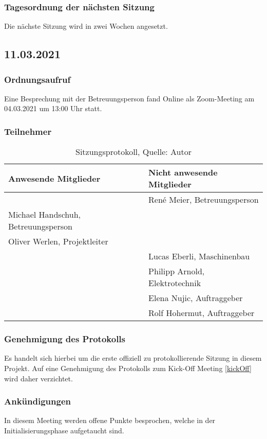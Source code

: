 \subsubsection{Tagesordnung der nächsten Sitzung}
Die nächste Sitzung wird in zwei Wochen angesetzt. 
\newpage
\subsection{11.03.2021}\label{Betreuermeeting1}
\subsubsection{Ordnungsaufruf}
Eine Besprechung mit der Betreuungsperson fand Online als Zoom-Meeting am 04.03.2021 um 13:00 Uhr statt.
\subsubsection{Teilnehmer}
\begin{table}[H]
	\setlength\extrarowheight{2pt} %
	\begin{tabularx}{\textwidth}{|X|X|}
		\hline
		\textbf{Anwesende Mitglieder} &  \textbf{Nicht anwesende Mitglieder} \\
		\hline
		& René Meier, Betreuungsperson  \\
		Michael Handschuh, Betreuungsperson &   \\
		Oliver Werlen, Projektleiter & \\
		& Lucas Eberli, Maschinenbau \\
		&Philipp Arnold, Elektrotechnik \\
		&Elena Nujic, Auftraggeber \\
		&Rolf Hohermut, Auftraggeber \\
		\hline
	\end{tabularx}
	\caption{ \label{tbl: Teilnehmerliste vom 11.03.2021}Sitzungsprotokoll, Quelle: Autor}
\end{table}
\subsubsection{Genehmigung des Protokolls}
Es handelt sich hierbei um die erste offiziell zu protokollierende Sitzung in diesem Projekt. Auf eine Genehmigung des Protokolls zum Kick-Off Meeting \ref{kickOff} wird daher verzichtet. 
\subsubsection{Ankündigungen}
In diesem Meeting werden offene Punkte besprochen, welche in der Initialisierungsphase aufgetaucht sind. 
